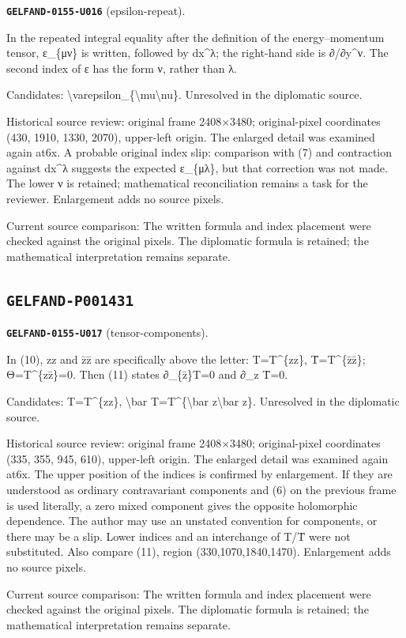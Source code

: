 \medskip
\par\noindent\leavevmode{}\label{GELFAND-0155-U016}\label{GELFAND-P001430:epsilon-repeat}\textbf{\texttt{GELFAND-0155-U016}} (epsilon-repeat).\nopagebreak[4]\par
In the repeated integral equality after the definition of the energy–momentum tensor, ε\_\{μν\} is written, followed by dx\textasciicircum{}λ; the right-hand side is ∂/∂y\textasciicircum{}ν. The second index of ε has the form ν, rather than λ.\par
Candidates: \textbackslash{}varepsilon\_\{\textbackslash{}mu\textbackslash{}nu\}. Unresolved in the diplomatic source.\par
Historical source review: original frame 2408×3480; original-pixel coordinates (430, 1910, 1330, 2070), upper-left origin. The enlarged detail was examined again at6x. A probable original index slip: comparison with (7) and contraction against dx\textasciicircum{}λ suggests the expected ε\_\{μλ\}, but that correction was not made. The lower ν is retained; mathematical reconciliation remains a task for the reviewer. Enlargement adds no source pixels.\par
Current source comparison: The written formula and index placement were checked against the original pixels. The diplomatic formula is retained; the mathematical interpretation remains separate.\par
\medskip
\subsection*{\texttt{GELFAND-P001431}}
\par\noindent\leavevmode{}\label{GELFAND-0155-U017}\label{GELFAND-P001431:tensor-components}\textbf{\texttt{GELFAND-0155-U017}} (tensor-components).\nopagebreak[4]\par
In (10), zz and z̄z̄ are specifically above the letter: T=T\textasciicircum{}\{zz\}, T̄=T\textasciicircum{}\{z̄z̄\}; Θ=T\textasciicircum{}\{zz̄\}=0. Then (11) states ∂\_\{z̄\}T=0 and ∂\_z T̄=0.\par
Candidates: T=T\textasciicircum{}\{zz\}, \textbackslash{}bar T=T\textasciicircum{}\{\textbackslash{}bar z\textbackslash{}bar z\}. Unresolved in the diplomatic source.\par
Historical source review: original frame 2408×3480; original-pixel coordinates (335, 355, 945, 610), upper-left origin. The enlarged detail was examined again at6x. The upper position of the indices is confirmed by enlargement. If they are understood as ordinary contravariant components and (6) on the previous frame is used literally, a zero mixed component gives the opposite holomorphic dependence. The author may use an unstated convention for components, or there may be a slip. Lower indices and an interchange of T/T̄ were not substituted. Also compare (11), region (330,1070,1840,1470). Enlargement adds no source pixels.\par
Current source comparison: The written formula and index placement were checked against the original pixels. The diplomatic formula is retained; the mathematical interpretation remains separate.\par
\medskip
